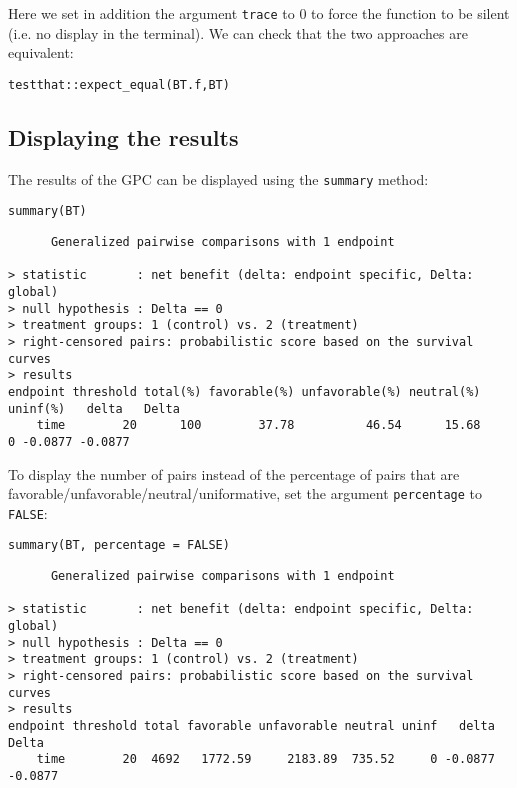 \documentclass[12pt]{article}
\begin{document}
Here we set in addition the argument \texttt{trace} to 0 to force the
function to be silent (i.e. no display in the terminal). We can check
that the two approaches are equivalent:
\lstset{language=r,label= ,caption= ,captionpos=b,numbers=none}
\begin{lstlisting}
testthat::expect_equal(BT.f,BT)
\end{lstlisting}

\subsection{Displaying the results}
\label{sec:orgc4814ba}

The results of the GPC can be displayed using the \texttt{summary} method:
\lstset{language=r,label= ,caption= ,captionpos=b,numbers=none}
\begin{lstlisting}
summary(BT)
\end{lstlisting}

\begin{verbatim}
      Generalized pairwise comparisons with 1 endpoint

> statistic       : net benefit (delta: endpoint specific, Delta: global) 
> null hypothesis : Delta == 0 
> treatment groups: 1 (control) vs. 2 (treatment) 
> right-censored pairs: probabilistic score based on the survival curves
> results
endpoint threshold total(%) favorable(%) unfavorable(%) neutral(%) uninf(%)   delta   Delta
    time        20      100        37.78          46.54      15.68        0 -0.0877 -0.0877
\end{verbatim}

 To display the number of pairs instead of the percentage of pairs
that are favorable/unfavorable/neutral/uniformative, set the argument
\texttt{percentage} to \texttt{FALSE}:
\lstset{language=r,label= ,caption= ,captionpos=b,numbers=none}
\begin{lstlisting}
summary(BT, percentage = FALSE)
\end{lstlisting}

\begin{verbatim}
      Generalized pairwise comparisons with 1 endpoint

> statistic       : net benefit (delta: endpoint specific, Delta: global) 
> null hypothesis : Delta == 0 
> treatment groups: 1 (control) vs. 2 (treatment) 
> right-censored pairs: probabilistic score based on the survival curves
> results
endpoint threshold total favorable unfavorable neutral uninf   delta   Delta
    time        20  4692   1772.59     2183.89  735.52     0 -0.0877 -0.0877
\end{verbatim}
\end{document}

